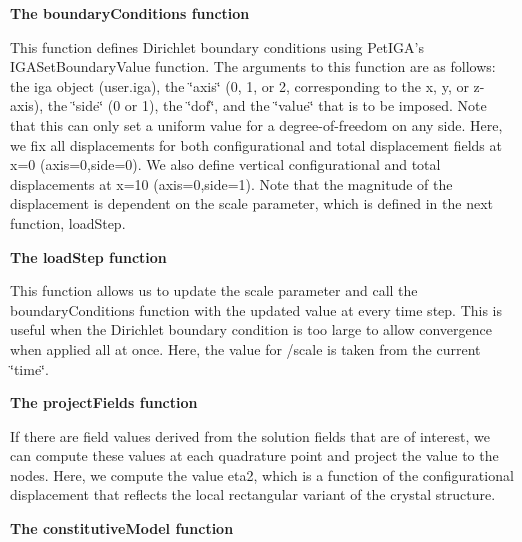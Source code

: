 {\bfseries  The {\ttfamily boundary\-Conditions} function }

This function defines Dirichlet boundary conditions using Pet\-I\-G\-A's {\ttfamily I\-G\-A\-Set\-Boundary\-Value} function. The arguments to this function are as follows\-: the iga object (user.\-iga), the \char`\"{}axis\char`\"{} (0, 1, or 2, corresponding to the x, y, or z-\/axis), the \char`\"{}side\char`\"{} (0 or 1), the \char`\"{}dof\char`\"{}, and the \char`\"{}value\char`\"{} that is to be imposed. Note that this can only set a uniform value for a degree-\/of-\/freedom on any side. Here, we fix all displacements for both configurational and total displacement fields at x=0 (axis=0,side=0). We also define vertical configurational and total displacements at x=10 (axis=0,side=1). Note that the magnitude of the displacement is dependent on the {\ttfamily scale} parameter, which is defined in the next function, {\ttfamily load\-Step}.


\begin{DoxyCodeInclude}

\end{DoxyCodeInclude}


{\bfseries  The {\ttfamily load\-Step} function }

This function allows us to update the {\ttfamily scale} parameter and call the {\ttfamily boundary\-Conditions} function with the updated value at every time step. This is useful when the Dirichlet boundary condition is too large to allow convergence when applied all at once. Here, the value for /scale is taken from the current \char`\"{}time\char`\"{}.


\begin{DoxyCodeInclude}

\end{DoxyCodeInclude}


{\bfseries  The {\ttfamily project\-Fields} function }

If there are field values derived from the solution fields that are of interest, we can compute these values at each quadrature point and project the value to the nodes. Here, we compute the value {\ttfamily eta2}, which is a function of the configurational displacement that reflects the local rectangular variant of the crystal structure.


\begin{DoxyCodeInclude}

\end{DoxyCodeInclude}


{\bfseries  The {\ttfamily constitutive\-Model} function }


